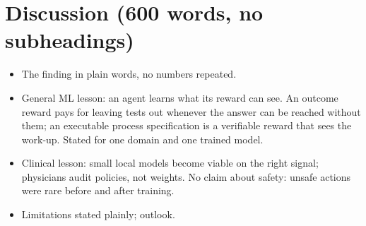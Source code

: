 
\section{Discussion (600 words, no subheadings)}\label{sec:discussion}


\content
\begin{itemize}
\item The finding in plain words, no numbers repeated.
\item General ML lesson: an agent learns what its reward can see. An outcome reward pays for leaving
tests out whenever the answer can be reached without them; an executable process specification is a
verifiable reward that sees the work-up. Stated for one domain and one trained model.
\item Clinical lesson: small local models become viable on the right signal; physicians audit
policies, not weights. No claim about safety: unsafe actions were rare before and after training.
\item Limitations stated plainly; outlook.
\end{itemize}

